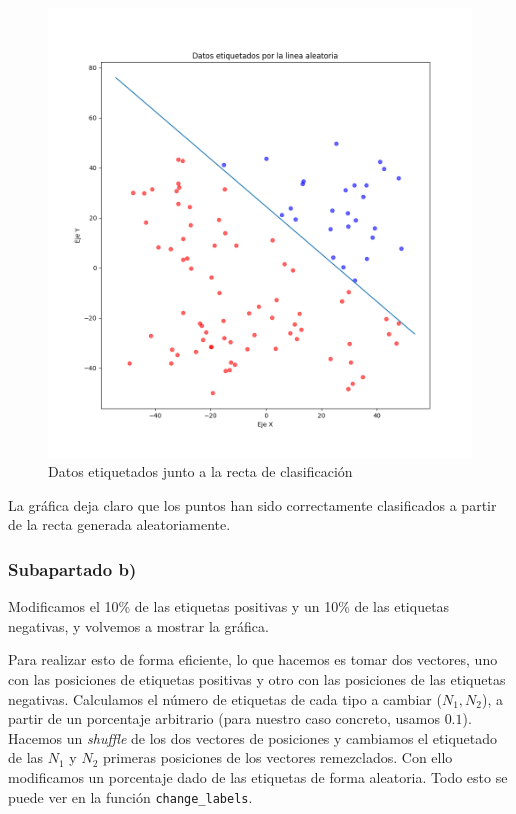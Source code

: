 \documentclass[11pt]{article}
\begin{document}
\begin{figure}[H]
    \includegraphics[width=0.9 \textwidth]{puntos_clasificados_recta01}
    \caption{Datos etiquetados junto a la recta de clasificación}
\end{figure}

La gráfica deja claro que los puntos han sido correctamente clasificados a partir de la recta generada aleatoriamente.

\subsubsection{Subapartado b)} \label{section:ejercicio1.2.b}

Modificamos el 10\% de las etiquetas positivas y un 10\% de las etiquetas negativas, y volvemos a mostrar la gráfica.

Para realizar esto de forma eficiente, lo que hacemos es tomar dos vectores, uno con las posiciones de etiquetas positivas y otro con las posiciones de las etiquetas negativas. Calculamos el número de etiquetas de cada tipo a cambiar ($N_1, N_2$), a partir de un porcentaje arbitrario (para nuestro caso concreto, usamos $0.1$). Hacemos un \emph{shuffle} de los dos vectores de posiciones y cambiamos el etiquetado de las $N_1$ y $N_2$ primeras posiciones  de los vectores remezclados. Con ello modificamos un porcentaje dado de las etiquetas de forma aleatoria. Todo esto se puede ver en la función \lstinline{change_labels}.
\end{document}
